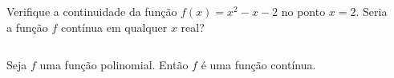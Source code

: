 \begin{frame}
  \begin{columns}[onlytextwidth]
    \begin{column}{0.7\textwidth}\vspace{-0.5cm}
      \begin{example}
        Verifique a continuidade da função $f(x)=x^2-x-2$ no ponto $x=2$. Seria a função $f$ contínua em qualquer $x$ real?
      \end{example}
    \end{column}
    \begin{column}{0.3\textwidth}\vspace{-0.5cm}
    \end{column}
  \end{columns}
\end{frame}

\begin{frame}
  \begin{theorem}
    Seja $f$ uma função polinomial. Então $f$ é uma função contínua.
  \end{theorem}
\end{frame}

